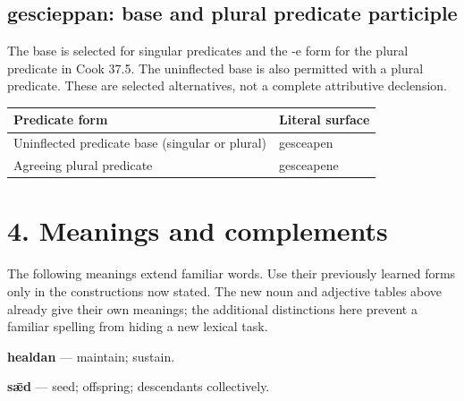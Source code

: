 \subsection*{gescieppan: base and plural predicate participle}

The base is selected for singular predicates and the -e form for the plural predicate in Cook 37.5. The uninflected base is also permitted with a plural predicate. These are selected alternatives, not a complete attributive declension.

\par\begingroup
\fontsize{10.5}{13.2}\selectfont
\setlength{\LTleft}{0pt}\setlength{\LTright}{\fill}
\noindent
\begin{tabular}{@{}>{\raggedright\arraybackslash}p{83.56mm}>{\raggedright\arraybackslash}p{37.63mm}@{}}
\toprule
\textbf{Predicate form} & \textbf{Literal surface} \\
\midrule
Uninflected predicate base (singular or plural) & gesceapen \\
Agreeing plural predicate & gesceapene \\
\bottomrule
\end{tabular}
\par\endgroup

\section*{4. Meanings and complements}

The following meanings extend familiar words. Use their previously learned forms only in the constructions now stated. The new noun and adjective tables above already give their own meanings; the additional distinctions here prevent a familiar spelling from hiding a new lexical task.

\textbf{healdan} — maintain; sustain.

\textbf{sǣd} — seed; offspring; descendants collectively.

